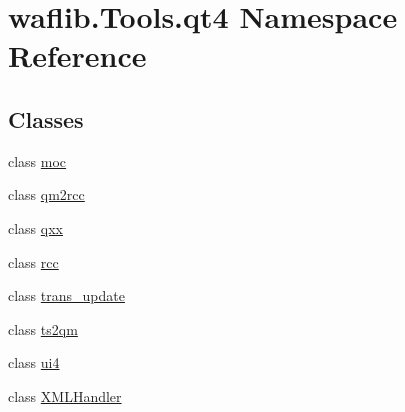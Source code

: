 \hypertarget{namespacewaflib_1_1_tools_1_1qt4}{}\section{waflib.\+Tools.\+qt4 Namespace Reference}
\label{namespacewaflib_1_1_tools_1_1qt4}
\subsection*{Classes}
\begin{DoxyCompactItemize}
\item 
class \hyperlink{classwaflib_1_1_tools_1_1qt4_1_1moc}{moc}
\item 
class \hyperlink{classwaflib_1_1_tools_1_1qt4_1_1qm2rcc}{qm2rcc}
\item 
class \hyperlink{classwaflib_1_1_tools_1_1qt4_1_1qxx}{qxx}
\item 
class \hyperlink{classwaflib_1_1_tools_1_1qt4_1_1rcc}{rcc}
\item 
class \hyperlink{classwaflib_1_1_tools_1_1qt4_1_1trans__update}{trans\+\_\+update}
\item 
class \hyperlink{classwaflib_1_1_tools_1_1qt4_1_1ts2qm}{ts2qm}
\item 
class \hyperlink{classwaflib_1_1_tools_1_1qt4_1_1ui4}{ui4}
\item 
class \hyperlink{classwaflib_1_1_tools_1_1qt4_1_1_x_m_l_handler}{X\+M\+L\+Handler}
\end{DoxyCompactItemize}
